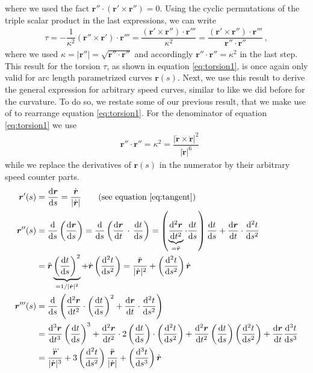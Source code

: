 \documentclass[11pt, DINA4, fleqn]{amsart}
\def\df{\mathrm{d}\xspace}
\newcommand{\dd}[2]{\frac{\df#1}{\df#2}}
\newcommand{\ddd}[2]{\frac{\df^2#1}{\df#2^2}}
\newcommand{\dddd}[2]{\frac{\df^3#1}{\df#2^3}}
\def\vr{\boldsymbol{r}\xspace}
\def\vrd{\dot{\vr}\xspace}
\def\vrdd{\ddot{\vr}\xspace}
\def\vrddd{\dddot{\vr}\xspace}
\def\vrp{{\vr}'\xspace}
\def\vrpp{{\vr}''\xspace}
\begin{document}
where we used the fact $\vr'' \cdot(\vr' \times \vr'') = 0$.
Using the cyclic permutations of the triple scalar product in the last expressions, we can write
\begin{align}
\tau = -\dfrac{1}{\kappa^2} \left(\vr''\times \vr'\right) \cdot \vr'''=
\dfrac{ \left(\vr'\times \vr''\right) \cdot \vr'''}{\kappa^2} = 
\dfrac{ \left(\vr'\times \vr''\right) \cdot \vr'''}{\vr''\cdot \vr''} \, ,
\label{eq:torsion1}
\end{align}
where we used $\kappa = |\vr''| = \sqrt{\vr''\cdot\vr''}$ and accordingly $\vr''\cdot \vr'' = \kappa^2$ in the last step.
This result for the torsion $\tau$, as shown in equation \eqref{eq:torsion1},  is once again only valid for arc length parametrized curves $\vr(s)$. Next, we use this result to derive the general expression for arbitrary speed curves, similar to like we did before for the curvature.
To do so, we restate some of our previous result, that we make use of to rearrange equation \eqref{eq:torsion1}.
For the denominator of equation \eqref{eq:torsion1} we use
\begin{align}
&\vr''\cdot\vr'' = \kappa^2 = \dfrac{|\vrd\times\vrdd|^2}{|\vrd|^6}
\end{align}
while we replace the derivatives of $\vr(s)$ in the numerator by their arbitrary speed counter parts.
\begin{align}
\vrp(s) &= \dd{\vr}{s} = \dfrac{\vrd}{|\vrd|} \qquad \text{(see equation \eqref{eq:tangent})} 
\label{eq:rpExp}\\
\vrpp(s) &= \dd{}{s}\left(\dd{\vr}{s}\right) = \dd{}{s}\left(\dd{\vr}{t} \, \cdot \, \dd{t}{s}\right)
= \left(\underbrace{\ddd{\vr}{t}}_{=\vrdd} \cdot \dd{t}{s}\right) \dd{t}{s} + \dd{\vr}{t} \cdot \ddd{t}{s}
\\
&= \vrdd \underbrace{\left(\dd{t}{s}\right)^2}_{=1/|\vrd|^2} + \vrd \left(\ddd{t}{s}\right)
= \dfrac{\vrdd}{|\vrd|^2} + \left(\ddd{t}{s}\right) \vrd
\label{eq:rppExp} \\
\vr'''(s) &= \dd{}{s}\left(
\ddd{\vr}{t} \cdot \left(\dd{t}{s}\right)^2
+ \dd{\vr}{t} \cdot \ddd{t}{s}
\right) \\
&= \dddd{\vr}{t} \left(\dd{t}{s}\right)^3 + \ddd{\vr}{t} \cdot 2 \left(\dd{t}{s}\right) \cdot \left(\ddd{t}{s}\right)
+ \ddd{\vr}{t}\left(\dd{t}{s}\right)\left(\ddd{t}{s}\right)
+ \dd{\vr}{t} \dddd{t}{s} \\
&= \dfrac{\vrddd}{|\vrd|^3} + 3 \left(\ddd{t}{s}\right)
\dfrac{\vrdd}{|\vrd|} + \left(\dddd{t}{s}\right) \vrd
\label{eq:rpppExp}\
\end{align}
\end{document}
